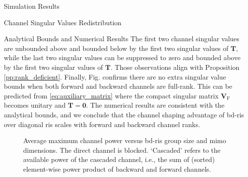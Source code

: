 \documentclass[journal]{IEEEtran}
\begin{document}
\begin{section}{Simulation Results}
\begin{subsection}{Channel Singular Values Redistribution}
\begin{subsubsection}{Analytical Bounds and Numerical Results}
			The first two channel singular values are unbounded above and bounded below by the first two singular values of $\mathbf{T}$, while the last two singular values can be suppressed to zero and bounded above by the first two singular values of $\mathbf{T}$.
			Those observations align with Proposition \ref{pp:rank_deficient}.
			Finally, Fig.  confirms there are no extra singular value bounds when both forward and backward channels are full-rank.
			This can be predicted from \eqref{eq:auxiliary_matrix} where the compact singular matrix $\mathbf{V}_\mathrm{F}$ becomes unitary and $\mathbf{T}=\mathbf{0}$.
			The numerical results are consistent with the analytical bounds, and we conclude that the channel shaping advantage of \gls{bd}-\gls{ris} over diagonal \gls{ris} scales with forward and backward channel ranks.


			\begin{figure}[!t]
				\centering
				\caption{
					Average maximum channel power versus \gls{bd}-\gls{ris} group size and \gls{mimo} dimensions.
					The direct channel is blocked.
					`Cascaded' refers to the available power of the cascaded channel, i.e., the sum of (sorted) element-wise power product of backward and forward channels.
				}
				\label{fg:power_bond}
			\end{figure}


\end{subsubsection}
\end{subsection}
\end{section}
\end{document}
